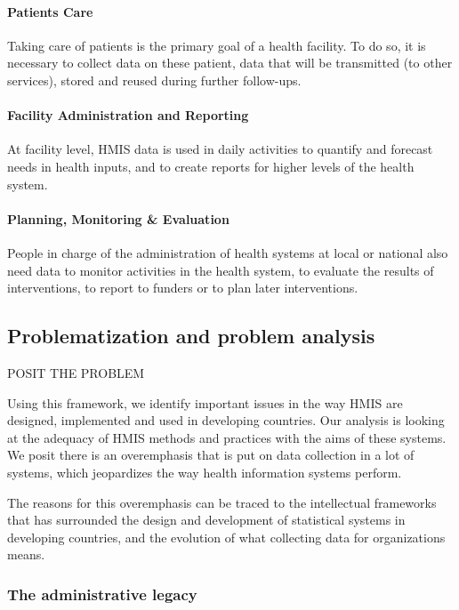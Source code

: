 \documentclass[a4paper,11pt,final,twoside]{article}
\begin{document}
\paragraph{Patients Care} Taking care of patients is the primary goal of a health facility. To do so, it is necessary to collect data on these patient, data that will be transmitted (to other services), stored and reused during further follow-ups. 

\paragraph{Facility Administration and Reporting} At facility level, HMIS data is used in daily activities to quantify and forecast needs in health inputs, and to create reports for higher levels of the health system. 

\paragraph{Planning, Monitoring \& Evaluation } People in charge of the administration of health systems at local or national also need data to monitor activities in the health system, to evaluate the results of interventions, to report to funders or to plan later interventions.

\subsection{Problematization and problem analysis}

POSIT THE PROBLEM

Using this framework, we identify important issues in the way HMIS are designed, implemented and used in developing countries. Our analysis is looking at the adequacy of HMIS methods and practices with the aims of these systems. We posit there is an overemphasis that is put on data collection in a lot of systems, which jeopardizes the way health information systems perform.

The reasons for this overemphasis can be traced to the intellectual frameworks that has surrounded the design and development of statistical systems in developing countries, and the evolution of what collecting data for organizations means.

\subsubsection{The administrative legacy}
\end{document}
